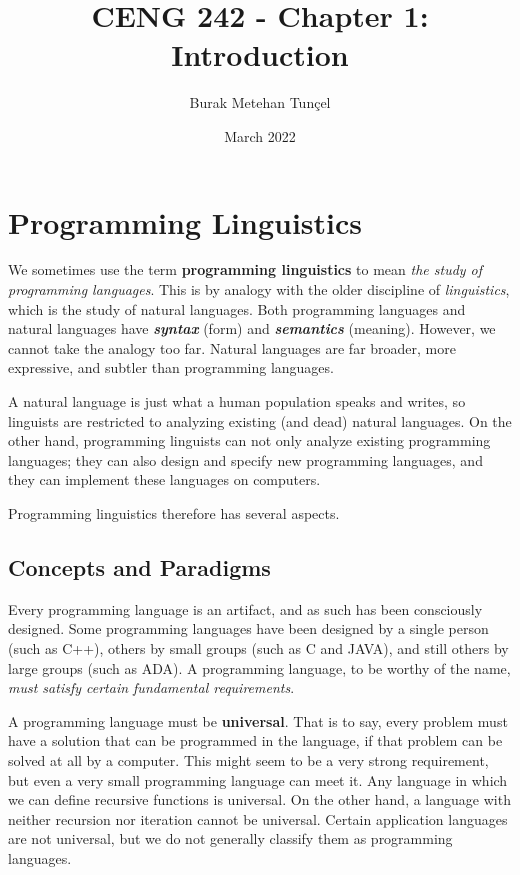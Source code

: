 \documentclass{article}
\title{CENG 242 - Chapter 1: Introduction}
\author{Burak Metehan Tunçel}
\date{March 2022}
\begin{document}
\maketitle

\section{Programming Linguistics}

We sometimes use the term \textbf{programming linguistics} to mean \textit{the study of programming languages}. This is by analogy with the older discipline of \textit{linguistics}, which is the study of natural languages. Both programming languages and natural languages have \textit{\textbf{syntax}} (form) and \textit{\textbf{semantics}} (meaning). However, we cannot take the analogy too far. Natural languages are far broader, more expressive, and subtler than programming languages. 

A natural language is just what a human population speaks and writes, so linguists are restricted to analyzing existing (and dead) natural languages. On the other hand, programming linguists can not only analyze existing programming languages; they can also design and specify new programming languages, and they can implement these languages on computers.

Programming linguistics therefore has several aspects.

\subsection{Concepts and Paradigms}

Every programming language is an artifact, and as such has been consciously
designed. Some programming languages have been designed by a single person
(such as C++), others by small groups (such as C and JAVA), and still others by large groups (such as ADA). A programming language, to be worthy of the name, \textit{must satisfy certain fundamental requirements}.

A programming language must be \textbf{universal}. That is to say, every problem must have a solution that can be programmed in the language, if that problem can be solved at all by a computer. This might seem to be a very strong requirement, but even a very small programming language can meet it.  
Any language in which we can define recursive functions is universal. On the other hand, a language with neither recursion nor iteration cannot be universal. Certain application languages are not universal, but we do not generally classify them as programming languages.
\end{document}
